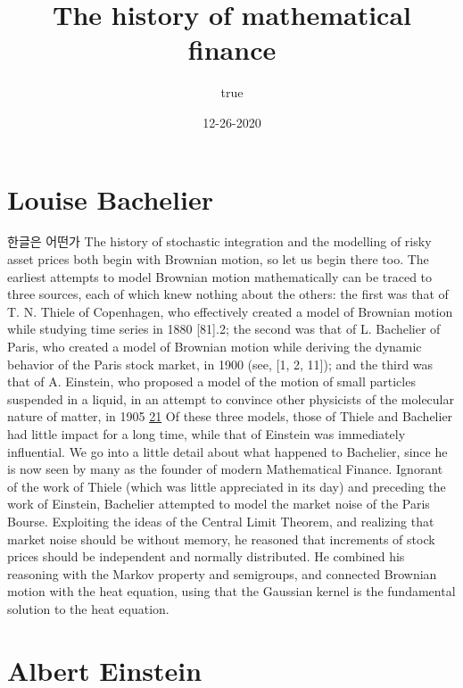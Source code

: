 \documentclass[]{tufte-handout}
\title{The history of mathematical finance}
\author{true}
\date{12-26-2020}
\begin{document}
\maketitle




\hypertarget{louise-bachelier}{%
\section{Louise Bachelier}\label{louise-bachelier}}

한글은 어떤가 The history of stochastic integration and the modelling of
risky asset prices both begin with Brownian motion, so let us begin
there too. The earliest attempts to model Brownian motion mathematically
can be traced to three sources, each of which knew nothing about the
others: the first was that of T. N. Thiele of Copenhagen, who
effectively created a model of Brownian motion while studying time
series in 1880 {[}81{]}.2; the second was that of L. Bachelier of Paris,
who created a model of Brownian motion while deriving the dynamic
behavior of the Paris stock market, in 1900 (see, {[}1, 2, 11{]}); and
the third was that of A. Einstein, who proposed a model of the motion of
small particles suspended in a liquid, in an attempt to convince other
physicists of the molecular nature of matter, in 1905
\href{See\%20\%5B64\%5D\%20for\%20a\%20discussion\%20of\%20Einstein’s\%20model\%20and\%20his\%20motivations.}{21}
Of these three models, those of Thiele and Bachelier had little impact
for a long time, while that of Einstein was immediately influential. We
go into a little detail about what happened to Bachelier, since he is
now seen by many as the founder of modern Mathematical Finance. Ignorant
of the work of Thiele (which was little appreciated in its day) and
preceding the work of Einstein, Bachelier attempted to model the market
noise of the Paris Bourse. Exploiting the ideas of the Central Limit
Theorem, and realizing that market noise should be without memory, he
reasoned that increments of stock prices should be independent and
normally distributed. He combined his reasoning with the Markov property
and semigroups, and connected Brownian motion with the heat equation,
using that the Gaussian kernel is the fundamental solution to the heat
equation.

\hypertarget{albert-einstein}{%
\section{Albert Einstein}\label{albert-einstein}}
\end{document}
